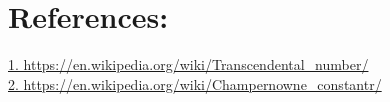 \documentclass[10pt]{article}
\begin{document}
\section*{\normalsize \textbf{References:}}
\url{1. https://en.wikipedia.org/wiki/Transcendental_number/} \\
\url{2. https://en.wikipedia.org/wiki/Champernowne_constantr/} 
\end{document}
